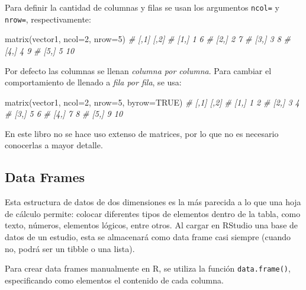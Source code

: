 \documentclass[
]{article}
\newenvironment{Shaded}{\begin{snugshade}}{\end{snugshade}}
\newcommand{\AttributeTok}[1]{\textcolor[rgb]{0.77,0.63,0.00}{#1}}
\newcommand{\CommentTok}[1]{\textcolor[rgb]{0.56,0.35,0.01}{\textit{#1}}}
\newcommand{\ConstantTok}[1]{\textcolor[rgb]{0.00,0.00,0.00}{#1}}
\newcommand{\DecValTok}[1]{\textcolor[rgb]{0.00,0.00,0.81}{#1}}
\newcommand{\FunctionTok}[1]{\textcolor[rgb]{0.00,0.00,0.00}{#1}}
\newcommand{\NormalTok}[1]{#1}
\theoremstyle{definition}
\theoremstyle{definition}
\theoremstyle{definition}
\theoremstyle{definition}
\theoremstyle{remark}
\begin{document}
Para definir la cantidad de columnas y filas se usan los argumentos \texttt{ncol=} y \texttt{nrow=}, respectivamente:

\begin{Shaded}
\begin{Highlighting}[]
\FunctionTok{matrix}\NormalTok{(vector1, }\AttributeTok{ncol=}\DecValTok{2}\NormalTok{, }\AttributeTok{nrow=}\DecValTok{5}\NormalTok{)}
\CommentTok{\#      [,1] [,2]}
\CommentTok{\# [1,]    1    6}
\CommentTok{\# [2,]    2    7}
\CommentTok{\# [3,]    3    8}
\CommentTok{\# [4,]    4    9}
\CommentTok{\# [5,]    5   10}
\end{Highlighting}
\end{Shaded}

Por defecto las columnas se llenan \emph{columna por columna}. Para cambiar el comportamiento de llenado a \emph{fila por fila}, se usa:

\begin{Shaded}
\begin{Highlighting}[]
\FunctionTok{matrix}\NormalTok{(vector1, }\AttributeTok{ncol=}\DecValTok{2}\NormalTok{, }\AttributeTok{nrow=}\DecValTok{5}\NormalTok{, }\AttributeTok{byrow=}\ConstantTok{TRUE}\NormalTok{)}
\CommentTok{\#      [,1] [,2]}
\CommentTok{\# [1,]    1    2}
\CommentTok{\# [2,]    3    4}
\CommentTok{\# [3,]    5    6}
\CommentTok{\# [4,]    7    8}
\CommentTok{\# [5,]    9   10}
\end{Highlighting}
\end{Shaded}

En este libro no se hace uso extenso de matrices, por lo que no es necesario conocerlas a mayor detalle.

\hypertarget{data-frames}{%
\subsection{Data Frames}\label{data-frames}}

Esta estructura de datos de dos dimensiones es la más parecida a lo que una hoja de cálculo permite: colocar diferentes tipos de elementos dentro de la tabla, como texto, números, elementos lógicos, entre otros. Al cargar en RStudio una base de datos de un estudio, esta se almacenará como data frame casi siempre (cuando no, podrá ser un tibble o una lista).

Para crear data frames manualmente en R, se utiliza la función \texttt{data.frame()}, especificando como elementos el contenido de cada columna.
\end{document}
